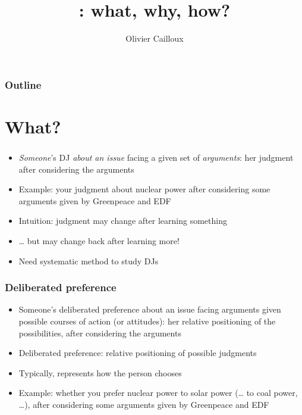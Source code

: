 \documentclass[french, english]{beamer}
\title[Deliberated judgment]{\glspdffmtfull{DJ}: what, why, how?}
\author{Olivier Cailloux \inst{1}}
\institute[LAMSADE]{\inst{1} LAMSADE, Université Paris-Dauphine}
\date{\formatdate{7}{11}{2024}}
\begin{document}
\begin{frame}[plain]
	\titlepage
\end{frame}
\addtocounter{framenumber}{-1}

\begin{frame}
	\frametitle{Outline}
	\tableofcontents[hideallsubsections, sectionstyle=shaded/show]
\end{frame}



\section{What?}
\begin{frame}
	\frametitle{}
	\begin{itemize}
		\item \emph{Someone}’s \gls{DJ} \emph{about an issue} facing a given set of \emph{arguments}: her judgment after considering the arguments
		\item Example: your judgment about nuclear power after considering some arguments given by Greenpeace and EDF
		\item Intuition: judgment may change after learning something
		\item … but may change back after learning more!
		\item Need systematic method to study \glspl{DJ}
	\end{itemize}
\end{frame}

\begin{frame}
	\frametitle{Deliberated preference}
	\begin{itemize}
		\item Someone’s deliberated preference about an issue facing arguments given possible courses of action (or attitudes): her relative positioning of the possibilities, after considering the arguments
		\item Deliberated preference: relative positioning of possible judgments
		\item Typically, represents how the person chooses
		\item Example: whether you prefer nuclear power to solar power (… to coal power, …), after considering some arguments given by Greenpeace and EDF
	\end{itemize}
\end{frame}
\end{document}
